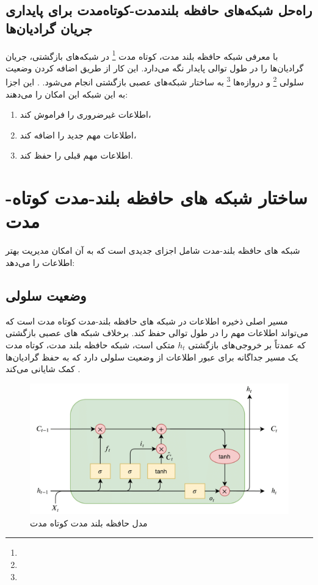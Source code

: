 \subsection{راه‌حل شبکه‌های حافظه بلندمدت-کوتاه‌مدت برای پایداری جریان گرادیان‌ها}
 با معرفی شبکه حافظه بلند مدت، کوتاه مدت \footnote{} در شبکه‌های بازگشتی، جریان گرادیان‌ها را در طول توالی پایدار نگه می‌دارد. این کار از طریق اضافه کردن وضعیت سلولی \footnote{} و دروازه‌ها \footnote{} به ساختار شبکه‌های عصبی بازگشتی انجام می‌شود.
\cite{gers1999learning}.
این اجزا به این شبکه این امکان را می‌دهند:

\begin{enumerate}
	\item اطلاعات غیرضروری را فراموش کند،
	\item اطلاعات مهم جدید را اضافه کند،
	\item اطلاعات مهم قبلی را حفظ کند.
\end{enumerate}

\section{ساختار شبکه های حافظه بلند-مدت کوتاه-مدت}
شبکه های حافظه بلند-مدت  شامل اجزای جدیدی است که به آن امکان مدیریت بهتر اطلاعات را می‌دهد:




\subsection{وضعیت سلولی}
مسیر اصلی ذخیره اطلاعات در  شبکه های حافظه بلند-مدت کوتاه مدت است که می‌تواند اطلاعات مهم را در طول توالی حفظ کند. برخلاف شبکه های عصبی بازگشتی که عمدتاً بر خروجی‌های بازگشتی \( h_t \) متکی است،  شبکه حافظه بلند مدت، کوتاه مدت  یک مسیر جداگانه برای عبور اطلاعات از وضعیت سلولی دارد که به حفظ گرادیان‌ها کمک شایانی می‌کند
\cite{hochreiter1997long}.


 \begin{figure}[h]
	\centering
	\begin{minipage}[b]{0.7\textwidth}
		\centering
		\includegraphics[width=\textwidth]{transformer_images/lstm.png}
		\caption{مدل حافظه بلند مدت کوتاه مدت}
		\label{fig:LSTM}
	\end{minipage}
	\hfill
	
\end{figure}



